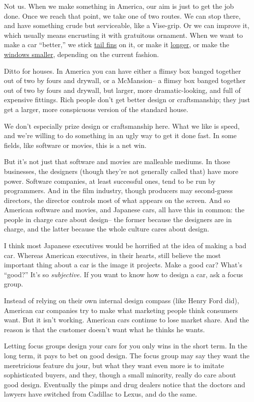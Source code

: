 \documentclass[12pt]{book}
\begin{document}
Not us. When we make something in America, our aim is just to get the
job done. Once we reach that point, we take one of two routes. We can
stop there, and have something crude but serviceable, like a Vise-grip.
Or we can improve it, which usually means encrusting it with gratuitous
ornament. When we want to make a car ``better,'' we stick
\href{59eldorado.html}{tail fins} on it, or make it
\href{75eldorado.html}{longer}, or make the \href{04magnum.html}{windows
smaller}, depending on the current fashion.

Ditto for houses. In America you can have either a flimsy box banged
together out of two by fours and drywall, or a McMansion-- a flimsy box
banged together out of two by fours and drywall, but larger, more
dramatic-looking, and full of expensive fittings. Rich people don't get
better design or craftsmanship; they just get a larger, more conspicuous
version of the standard house.

We don't especially prize design or craftsmanship here. What we like is
speed, and we're willing to do something in an ugly way to get it done
fast. In some fields, like software or movies, this is a net win.

But it's not just that software and movies are malleable mediums. In
those businesses, the designers (though they're not generally called
that) have more power. Software companies, at least successful ones,
tend to be run by programmers. And in the film industry, though
producers may second-guess directors, the director controls most of what
appears on the screen. And so American software and movies, and Japanese
cars, all have this in common: the people in charge care about design--
the former because the designers are in charge, and the latter because
the whole culture cares about design.

I think most Japanese executives would be horrified at the idea of
making a bad car. Whereas American executives, in their hearts, still
believe the most important thing about a car is the image it projects.
Make a good car? What's ``good?'' It's so \emph{subjective.} If you want
to know how to design a car, ask a focus group.

Instead of relying on their own internal design compass (like Henry Ford
did), American car companies try to make what marketing people think
consumers want. But it isn't working. American cars continue to lose
market share. And the reason is that the customer doesn't want what he
thinks he wants.

Letting focus groups design your cars for you only wins in the short
term. In the long term, it pays to bet on good design. The focus group
may say they want the meretricious feature du jour, but what they want
even more is to imitate sophisticated buyers, and they, though a small
minority, really do care about good design. Eventually the pimps and
drug dealers notice that the doctors and lawyers have switched from
Cadillac to Lexus, and do the same.
\end{document}
